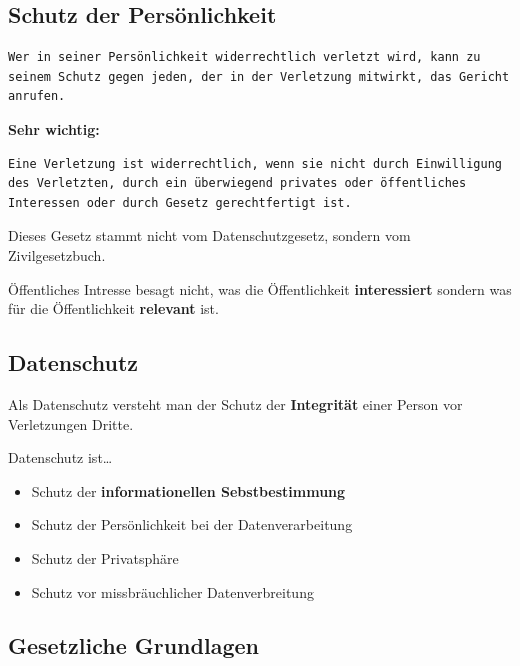 \hypertarget{schutz-der-persuxf6nlichkeit}{%
\subsection{Schutz der
Persönlichkeit}\label{schutz-der-persuxf6nlichkeit}}

\begin{verbatim}
Wer in seiner Persönlichkeit widerrechtlich verletzt wird, kann zu seinem Schutz gegen jeden, der in der Verletzung mitwirkt, das Gericht  anrufen.
\end{verbatim}

\textbf{Sehr wichtig:}

\begin{verbatim}
Eine Verletzung ist widerrechtlich, wenn sie nicht durch Einwilligung des Verletzten, durch ein überwiegend privates oder öffentliches Interessen oder durch Gesetz gerechtfertigt ist.
\end{verbatim}

Dieses Gesetz stammt nicht vom Datenschutzgesetz, sondern vom
Zivilgesetzbuch.

Öffentliches Intresse besagt nicht, was die Öffentlichkeit
\textbf{interessiert} sondern was für die Öffentlichkeit
\textbf{relevant} ist.

\hypertarget{datenschutz}{%
\subsection{Datenschutz}\label{datenschutz}}

Als Datenschutz versteht man der Schutz der \textbf{Integrität} einer
Person vor Verletzungen Dritte.

Datenschutz ist\ldots{}

\begin{itemize}
\tightlist
\item
  Schutz der \textbf{informationellen Sebstbestimmung}
\item
  Schutz der Persönlichkeit bei der Datenverarbeitung
\item
  Schutz der Privatsphäre
\item
  Schutz vor missbräuchlicher Datenverbreitung
\end{itemize}

\hypertarget{gesetzliche-grundlagen}{%
\subsection{Gesetzliche Grundlagen}\label{gesetzliche-grundlagen}}

